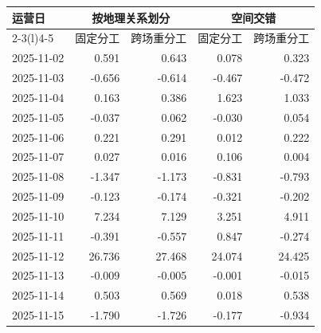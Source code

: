 \begin{tabular*}{0.92\linewidth}{@{\extracolsep{\fill}}lrrrr@{}}
\toprule
运营日 & \multicolumn{2}{c}{按地理关系划分} & \multicolumn{2}{c}{空间交错} \\
\cmidrule(lr){2-3}\cmidrule(l){4-5}
 & 固定分工 & 跨场重分工 & 固定分工 & 跨场重分工 \\
\midrule
2025-11-02 & 0.591 & 0.643 & 0.078 & 0.323 \\
2025-11-03 & -0.656 & -0.614 & -0.467 & -0.472 \\
2025-11-04 & 0.163 & 0.386 & 1.623 & 1.033 \\
2025-11-05 & -0.037 & 0.062 & -0.030 & 0.054 \\
2025-11-06 & 0.221 & 0.291 & 0.012 & 0.222 \\
2025-11-07 & 0.027 & 0.016 & 0.106 & 0.004 \\
2025-11-08 & -1.347 & -1.173 & -0.831 & -0.793 \\
2025-11-09 & -0.123 & -0.174 & -0.321 & -0.202 \\
2025-11-10 & 7.234 & 7.129 & 3.251 & 4.911 \\
2025-11-11 & -0.391 & -0.557 & 0.847 & -0.274 \\
2025-11-12 & 26.736 & 27.468 & 24.074 & 24.425 \\
2025-11-13 & -0.009 & -0.005 & -0.001 & -0.015 \\
2025-11-14 & 0.503 & 0.569 & 0.018 & 0.538 \\
2025-11-15 & -1.790 & -1.726 & -0.177 & -0.934 \\
\bottomrule
\end{tabular*}
